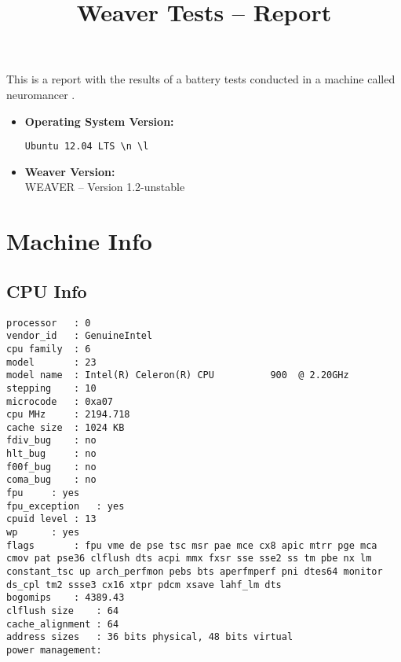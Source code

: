 \documentclass{article}
\title{Weaver Tests -- Report}
\begin{document}
\maketitle
This is a report with the results of a battery
tests conducted in a machine called 
neuromancer
.
\begin{itemize}
\item
\textbf{Operating System Version: }
\begin{verbatim}
Ubuntu 12.04 LTS \n \l

\end{verbatim}
\item
\textbf{Weaver Version: }\\
WEAVER -- Version 1.2-unstable
\end{itemize}
\section{Machine Info}
\subsection{CPU Info}
\begin{verbatim}
processor	: 0
vendor_id	: GenuineIntel
cpu family	: 6
model		: 23
model name	: Intel(R) Celeron(R) CPU          900  @ 2.20GHz
stepping	: 10
microcode	: 0xa07
cpu MHz		: 2194.718
cache size	: 1024 KB
fdiv_bug	: no
hlt_bug		: no
f00f_bug	: no
coma_bug	: no
fpu		: yes
fpu_exception	: yes
cpuid level	: 13
wp		: yes
flags		: fpu vme de pse tsc msr pae mce cx8 apic mtrr pge mca cmov pat pse36 clflush dts acpi mmx fxsr sse sse2 ss tm pbe nx lm constant_tsc up arch_perfmon pebs bts aperfmperf pni dtes64 monitor ds_cpl tm2 ssse3 cx16 xtpr pdcm xsave lahf_lm dts
bogomips	: 4389.43
clflush size	: 64
cache_alignment	: 64
address sizes	: 36 bits physical, 48 bits virtual
power management:

\end{verbatim}
\end{document}
